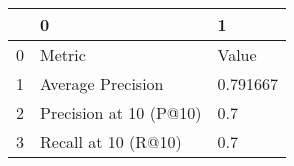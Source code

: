 \begin{tabular}{lll}
\toprule
{} &                       0 &         1 \\
\midrule
0 &                  Metric &     Value \\
1 &       Average Precision &  0.791667 \\
2 &  Precision at 10 (P@10) &       0.7 \\
3 &     Recall at 10 (R@10) &       0.7 \\
\bottomrule
\end{tabular}
